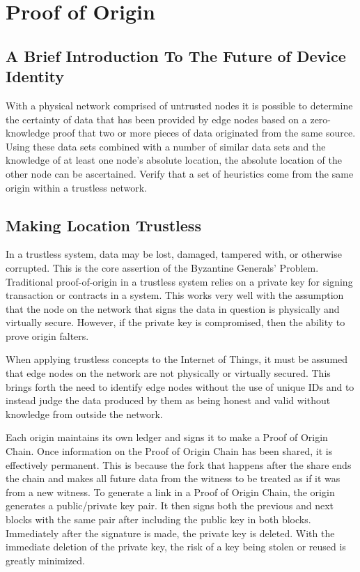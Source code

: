\documentclass{article}
\begin{document}
\section {Proof of Origin}


\subsection {A Brief Introduction To The Future of Device Identity}
With a physical network comprised of untrusted nodes it is possible to determine the \gls{certainty} of data that has been provided by edge nodes based on a zero-knowledge proof that two or more pieces of data originated from the same source. Using these data sets combined with a number of similar data sets and the knowledge of at least one node's absolute location, the absolute location of the other node can be ascertained. Verify that a set of \glspl{heuristic} come from the same origin within a trustless network.

\subsection {Making Location Trustless}
In a trustless system, data may be lost, damaged, tampered with, or otherwise corrupted. This is the core assertion of the Byzantine Generals' Problem. Traditional \Gls{proof-of-origin} in a trustless system relies on a private key for signing transaction or contracts in a system. This works very well with the assumption that the node on the network that signs the data in question is physically and virtually secure. However, if the private key is compromised, then the ability to prove origin falters.

When applying trustless concepts to the Internet of Things, it must be assumed that edge nodes on the network are not physically or virtually secured. This brings forth the need to identify edge nodes without the use of unique IDs and to instead judge the data produced by them as being honest and valid without knowledge from outside the network.

Each origin maintains its own ledger and signs it to make a Proof of Origin Chain. Once information on the Proof of Origin Chain has been shared, it is effectively permanent. This is because the fork that happens after the share ends the chain and makes all future data from the witness to be treated as if it was from a new witness. To generate a link in a Proof of Origin Chain, the origin generates a public/private key pair. It then signs both the previous and next blocks with the same pair after including the public key in both blocks. Immediately after the signature is made, the private key is deleted. With the immediate deletion of the private key, the risk of a key being stolen or reused is greatly minimized.
\end{document}
